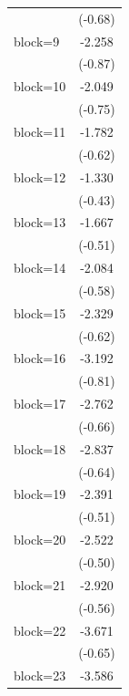 \documentclass{article}
\begin{document}
{\begin{longtable}{l*{1}{c}}
                    &     (-0.68)         \\
[1em]
block=9             &      -2.258         \\
                    &     (-0.87)         \\
[1em]
block=10            &      -2.049         \\
                    &     (-0.75)         \\
[1em]
block=11            &      -1.782         \\
                    &     (-0.62)         \\
[1em]
block=12            &      -1.330         \\
                    &     (-0.43)         \\
[1em]
block=13            &      -1.667         \\
                    &     (-0.51)         \\
[1em]
block=14            &      -2.084         \\
                    &     (-0.58)         \\
[1em]
block=15            &      -2.329         \\
                    &     (-0.62)         \\
[1em]
block=16            &      -3.192         \\
                    &     (-0.81)         \\
[1em]
block=17            &      -2.762         \\
                    &     (-0.66)         \\
[1em]
block=18            &      -2.837         \\
                    &     (-0.64)         \\
[1em]
block=19            &      -2.391         \\
                    &     (-0.51)         \\
[1em]
block=20            &      -2.522         \\
                    &     (-0.50)         \\
[1em]
block=21            &      -2.920         \\
                    &     (-0.56)         \\
[1em]
block=22            &      -3.671         \\
                    &     (-0.65)         \\
[1em]
block=23            &      -3.586         \\

\end{longtable}}
\end{document}
